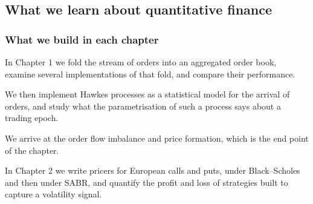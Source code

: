 
\subsection{What we learn about quantitative finance}

\begin{frame}
  \frametitle{What we build in each chapter}
In Chapter 1 we fold the stream of orders into an aggregated order book,
examine several implementations of that fold,
and compare their performance.

\pause

We then implement Hawkes processes as a statistical model for the arrival of orders,
and study what the parametrisation of such a process says about a trading epoch.

\pause

We arrive at the order flow imbalance and price formation,
which is the end point of the chapter.

\pause

In Chapter 2 we write pricers for European calls and puts,
under Black--Scholes and then under SABR,
and quantify the profit and loss of strategies built to capture a volatility signal.
\end{frame}
